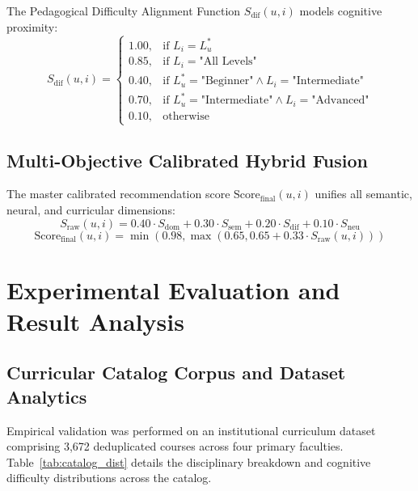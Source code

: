 \documentclass[conference,letterpaper]{IEEEtran}
\begin{document}
The Pedagogical Difficulty Alignment Function $S_{\text{dif}}(u, i)$ models cognitive proximity:
\begin{equation}
S_{\text{dif}}(u, i) = 
\begin{cases} 
1.00, & \text{if } L_i = L_u^* \\
0.85, & \text{if } L_i = \text{"All Levels"} \\
0.40, & \text{if } L_u^* = \text{"Beginner"} \land L_i = \text{"Intermediate"} \\
0.70, & \text{if } L_u^* = \text{"Intermediate"} \land L_i = \text{"Advanced"} \\
0.10, & \text{otherwise}
\end{cases}
\end{equation}

\subsection{Multi-Objective Calibrated Hybrid Fusion}
The master calibrated recommendation score $\text{Score}_{\text{final}}(u, i)$ unifies all semantic, neural, and curricular dimensions:
\begin{equation}
S_{\text{raw}}(u, i) = 0.40 \cdot S_{\text{dom}} + 0.30 \cdot S_{\text{sem}} + 0.20 \cdot S_{\text{dif}} + 0.10 \cdot S_{\text{neu}}
\end{equation}
\begin{equation}
\text{Score}_{\text{final}}(u, i) = \min\left(0.98, \max\left(0.65, 0.65 + 0.33 \cdot S_{\text{raw}}(u, i)\right)\right)
\end{equation}

\section{Experimental Evaluation and Result Analysis}

\subsection{Curricular Catalog Corpus and Dataset Analytics}
Empirical validation was performed on an institutional curriculum dataset comprising 3,672 deduplicated courses across four primary faculties. Table~\ref{tab:catalog_dist} details the disciplinary breakdown and cognitive difficulty distributions across the catalog.
\end{document}
